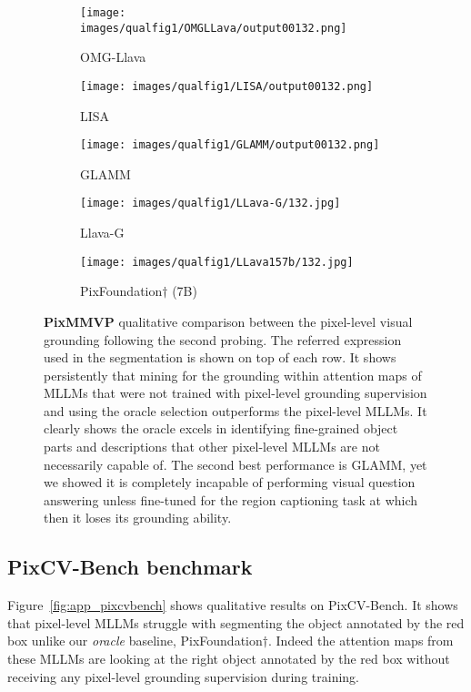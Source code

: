 \begin{figure*}[t]
\begin{subfigure}{0.19\textwidth}
\texttt{[image: images/qualfig1/OMGLLava/output00132.png]}
\caption{OMG-Llava}
\end{subfigure}%
\begin{subfigure}{0.19\textwidth}
\texttt{[image: images/qualfig1/LISA/output00132.png]}
\caption{LISA}
\end{subfigure}%
\begin{subfigure}{0.19\textwidth}
\texttt{[image: images/qualfig1/GLAMM/output00132.png]}
\caption{GLAMM}
\end{subfigure}%
\begin{subfigure}{0.19\textwidth}
\texttt{[image: images/qualfig1/LLava-G/132.jpg]}
\caption{Llava-G}
\end{subfigure}%
\begin{subfigure}{0.19\textwidth}
\texttt{[image: images/qualfig1/LLava157b/132.jpg]}
\caption{PixFoundation$\dagger$ (7B)}
\end{subfigure}
\caption{\textbf{PixMMVP} qualitative comparison between the pixel-level visual grounding following the second probing. The referred expression used in the segmentation is shown on top of each row. It shows persistently that mining for the grounding within attention maps of MLLMs that were not trained with pixel-level grounding supervision and using the oracle selection outperforms the pixel-level MLLMs. It clearly shows the oracle excels in identifying fine-grained object parts and descriptions that other pixel-level MLLMs are not necessarily capable of. The second best performance is GLAMM, yet we showed it is completely incapable of performing visual question answering unless fine-tuned for the region captioning task at which then it loses its grounding ability.}
\label{fig:app_pixmmvp}
\end{figure*}

\subsection{PixCV-Bench benchmark}
Figure~\ref{fig:app_pixcvbench} shows qualitative results on PixCV-Bench. It shows that pixel-level MLLMs struggle with segmenting the object annotated by the red box unlike our \textit{oracle} baseline, PixFoundation$\dagger$. Indeed the attention maps from these MLLMs are looking at the right object annotated by the red box without receiving any pixel-level grounding supervision during training.

